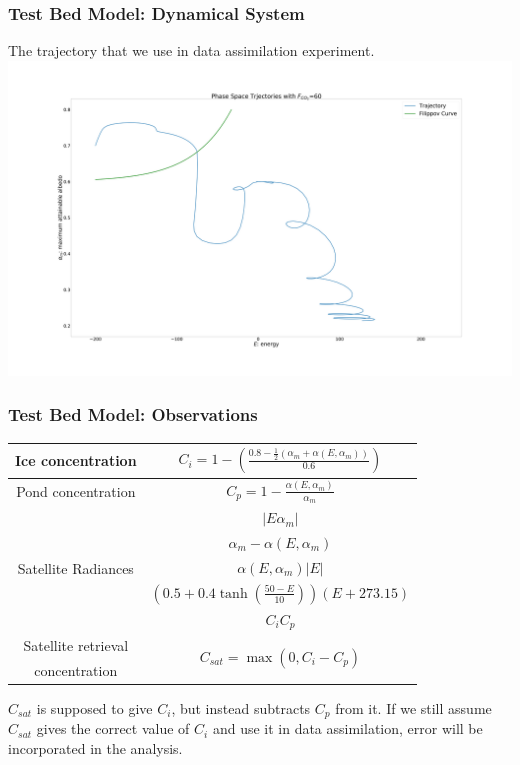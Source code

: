 \documentclass{beamer}
\begin{document}
\begin{frame}
\frametitle{Test Bed Model: Dynamical System}
The trajectory that we use in data assimilation experiment.
\centering
\includegraphics[width=\linewidth]{Figures/fc=60E=-200am=0_7.png}
\end{frame}

\begin{frame}
\frametitle{Test Bed Model: Observations}
\begin{center}
\begin{tabular}{|c|c|}\hline
Ice concentration & $C_i=1-\left(\frac{0.8-\frac{1}{2}\left( \alpha_m+\alpha(E,\alpha_m)\right)}{0.6}\right)$\\ \hline
Pond concentration & $C_p=1-\frac{\alpha(E,\alpha_m)}{\alpha_m}$ \\ \hline
\multirow{5}{*}{Satellite Radiances} 
& $|E\alpha_m|$\\ 
& $\alpha_m-\alpha(E,\alpha_m)$\\
& $\alpha(E,\alpha_m)|E|$\\
& $(0.5+0.4\tanh(\frac{50-E}{10}))(E+273.15)$\\
& $C_i C_p$\\ \hline

Satellite retrieval & \multirow{2}{*}{$C_{sat}=\max(0,C_i-C_p)$}\\
concentration & \\ \hline
\end{tabular}
\end{center}\par
$C_{sat}$ is supposed to give $C_i$, but instead subtracts $C_p$ from it. If we still assume $C_{sat}$ gives the correct value of $C_i$ and use it in data assimilation, error will be incorporated in the analysis.
\end{frame}
\end{document}

